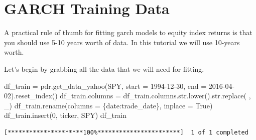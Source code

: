 \documentclass[
  letterpaper,
  DIV=11,
  numbers=noendperiod]{scrreprt}
\newenvironment{Shaded}{\begin{snugshade}}{\end{snugshade}}
\newcommand{\BuiltInTok}[1]{\textcolor[rgb]{0.00,0.23,0.31}{#1}}
\newcommand{\DecValTok}[1]{\textcolor[rgb]{0.68,0.00,0.00}{#1}}
\newcommand{\NormalTok}[1]{\textcolor[rgb]{0.00,0.23,0.31}{#1}}
\newcommand{\OperatorTok}[1]{\textcolor[rgb]{0.37,0.37,0.37}{#1}}
\newcommand{\StringTok}[1]{\textcolor[rgb]{0.13,0.47,0.30}{#1}}
\newcommand{\VariableTok}[1]{\textcolor[rgb]{0.07,0.07,0.07}{#1}}
\begin{document}
\hypertarget{garch-training-data}{%
\section{GARCH Training Data}\label{garch-training-data}}

A practical rule of thumb for fitting garch models to equity index
returns is that you should use 5-10 years worth of data. In this
tutorial we will use 10-years worth.

Let's begin by grabbing all the data that we will need for fitting.

\begin{Shaded}
\begin{Highlighting}[]
\NormalTok{df\_train }\OperatorTok{=}\NormalTok{ pdr.get\_data\_yahoo(}\StringTok{\textquotesingle{}SPY\textquotesingle{}}\NormalTok{, start }\OperatorTok{=} \StringTok{\textquotesingle{}1994{-}12{-}30\textquotesingle{}}\NormalTok{, end }\OperatorTok{=} \StringTok{\textquotesingle{}2016{-}04{-}02\textquotesingle{}}\NormalTok{).reset\_index()}
\NormalTok{df\_train.columns }\OperatorTok{=}\NormalTok{ df\_train.columns.}\BuiltInTok{str}\NormalTok{.lower().}\BuiltInTok{str}\NormalTok{.replace(}\StringTok{\textquotesingle{} \textquotesingle{}}\NormalTok{, }\StringTok{\textquotesingle{}\_\textquotesingle{}}\NormalTok{)}
\NormalTok{df\_train.rename(columns }\OperatorTok{=}\NormalTok{ \{}\StringTok{\textquotesingle{}date\textquotesingle{}}\NormalTok{:}\StringTok{\textquotesingle{}trade\_date\textquotesingle{}}\NormalTok{\}, inplace }\OperatorTok{=} \VariableTok{True}\NormalTok{)}
\NormalTok{df\_train.insert(}\DecValTok{0}\NormalTok{, }\StringTok{\textquotesingle{}ticker\textquotesingle{}}\NormalTok{, }\StringTok{\textquotesingle{}SPY\textquotesingle{}}\NormalTok{)}
\NormalTok{df\_train}
\end{Highlighting}
\end{Shaded}

\begin{verbatim}
[*********************100%***********************]  1 of 1 completed
\end{verbatim}
\end{document}
